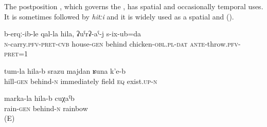 The postposition , which governs the , has spatial and occasionally temporal uses. It is sometimes followed by \textit{hitːi} and it is widely used as a spatial and  ().
%
\begin{exe}
	\ex
	\begin{xlist}
		\ex	\label{I carried (the cheese) behind the house and fed it to the chicken}
		\gll	b-erqː-ib-le	qal-la	hila,	ʡuˁrʡ-aˁ-j	s-ix-ub=da  \\
			\textsc{n}-carry.\textsc{pfv}-\textsc{pret}-\textsc{cvb}	house-\textsc{gen}	behind	chicken-\textsc{obl}.\textsc{pl}-\textsc{dat}	\textsc{ante}-throw.\textsc{pfv}-\textsc{pret}=1\\
		\glt	{}

		\ex	\label{There behind the hill there is immediately something like a field}
		\gll	tum-la	hila-b	srazu	majdan ʁuna	k'e-b\\
			hill-\textsc{gen}	behind-\textsc{n}	immediately	field	\textsc{eq}	exist.\textsc{up-n}\\
		\glt	{}

		\ex	\label{a rainbow after the rain}
		\gll	marka-la	hila-b	cuχaˁb  \\
			rain-\textsc{gen}	behind-\textsc{n}	rainbow\\
		\glt	{} (E)
	\end{xlist}
\end{exe}



\subsection{ }
\label{ssec:postposition hiti}

